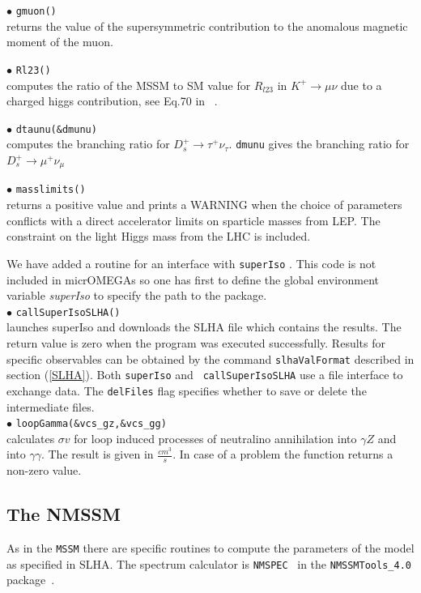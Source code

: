 \documentclass[12pt,a4paper]{article}
\begin{document}
\noi$\bullet$ \verb|gmuon()|\\
returns the value of the supersymmetric contribution to the
anomalous magnetic moment of the muon.

\noi$\bullet$ \verb|Rl23()|\\
computes the ratio of the MSSM to SM value for $R_{l23}$ in $K^+\rightarrow \mu\nu$  due to a  charged higgs contribution, see Eq.70 in ~\cite{Belanger:2013oya}. 

\noi$\bullet$ \verb|dtaunu(&dmunu)|\\
computes the branching ratio  for ${D}_s^+\rightarrow\tau^+\nu_\tau$. \verb|dmunu| 
gives  the branching ratio  for ${D}_s^+\rightarrow\mu^+\nu_\mu$

 
\noi$\bullet$ \verb|masslimits()|\\
returns a positive value  and
 prints a WARNING when the choice of parameters conflicts with a
direct accelerator limits on sparticle masses from LEP.
The constraint on the light Higgs mass from the LHC is included.  

We have added a routine for an interface with {\tt superIso}
\cite{Arbey:2011zz}. This code is not 
included in micrOMEGAs so one has first to define 
the global environment  variable {\it superIso} 
to specify the path to the package.\\ 
\noi$\bullet$ \verb|callSuperIsoSLHA()|\\
launches superIso and downloads the SLHA file which  contains the results. The
return value is zero when the program was  executed successfully.  Results
for specific  observables can be obtained by the command {\tt slhaValFormat}
described in  section (\ref{SLHA}).  Both {\tt superIso} and {\tt
callSuperIsoSLHA} use a file interface to exchange data. The {\tt delFiles} flag specifies whether
to save or delete the intermediate files.\\
\noi$\bullet$ \verb|loopGamma(&vcs_gz,&vcs_gg)|\\
calculates $\sigma v$ for  loop induced processes of neutralino
annihilation into $\gamma Z$ and into $\gamma \gamma$. The result is given in  
$\frac{cm^3}{s}$. In case of a problem the function returns a non-zero value. 

\subsection{The NMSSM}

As in the {\tt MSSM} there are specific routines to compute the  
parameters of the model as  specified in SLHA. The spectrum calculator is \verb|NMSPEC|~\cite{Ellwanger:2006rn}
 in the \verb|NMSSMTools_4.0| package~\cite{nmssmtools}.
\end{document}
